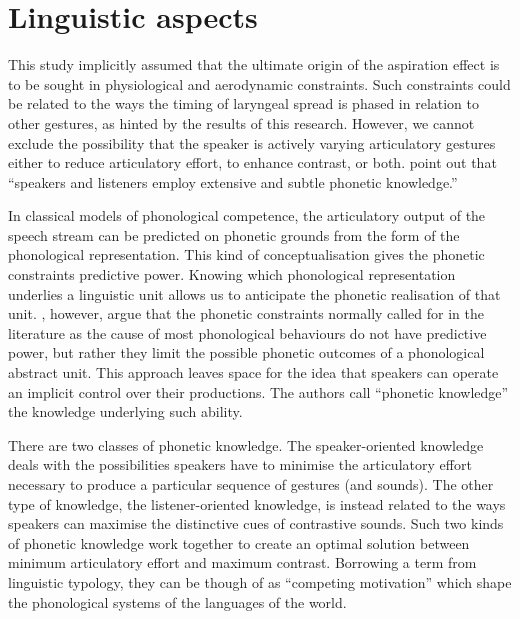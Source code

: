 \documentclass[11pt,a4paper,openany]{memoir}\usepackage[]{graphicx}\usepackage[]{color}
\begin{document}

\section{Linguistic aspects}
This study implicitly assumed that the ultimate origin of the aspiration effect is to be sought in physiological and aerodynamic constraints.
Such constraints could be related to the ways the timing of laryngeal spread is phased in relation to other gestures, as hinted by the results of this research.
However, we cannot exclude the possibility that the speaker is actively varying articulatory gestures either to reduce articulatory effort, to enhance contrast, or both.
\citet[423]{kingston1994} point out that ``speakers and listeners employ extensive and subtle phonetic knowledge.''

In classical models of phonological competence, the articulatory output of the speech stream can be predicted on phonetic grounds from the form of the phonological representation.
This kind of conceptualisation gives the phonetic constraints predictive power.
Knowing which phonological representation underlies a linguistic unit allows us to anticipate the phonetic realisation of that unit. 
\citeauthor{kingston1994}, however, argue that the phonetic constraints normally called for in the literature as the cause of most phonological behaviours do not have predictive power, but rather they limit the possible phonetic outcomes of a phonological abstract unit.
This approach leaves space for the idea that speakers can operate an implicit control over their productions.
The authors call ``phonetic knowledge'' the knowledge underlying such ability.

There are two classes of phonetic knowledge.
The speaker-oriented knowledge deals with the possibilities speakers have to minimise the articulatory effort necessary to produce a particular sequence of gestures (and sounds).
The other type of knowledge, the listener-oriented knowledge, is instead related to the ways speakers can maximise the distinctive cues of contrastive sounds.
Such two kinds of phonetic knowledge work together to create an optimal solution between minimum articulatory effort and maximum contrast.
Borrowing a term from linguistic typology, they can be though of as ``competing motivation'' which shape the phonological systems of the languages of the world.
\end{document}
